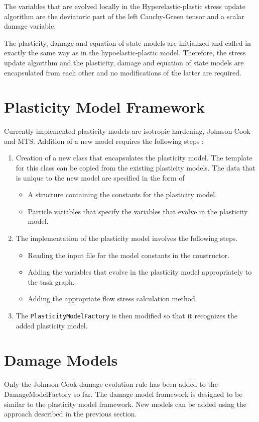The variables that are evolved locally in the Hyperelastic-plastic 
stress update algorithm are the deviatoric part of the left Cauchy-Green
tensor and a scalar damage variable.  

The plasticity, damage and equation of state models are initialized
and called in exactly the same way as in the hypoelastic-plastic 
model.  Therefore, the stress update algorithm and the plasticity,
damage and equation of state models are encapsulated from each other
and no modifications of the latter are required.

\section{Plasticity Model Framework}
Currently implemented plasticity models are isotropic hardening, 
Johnson-Cook and MTS.  Addition of a new model requires the 
following steps :

\begin{enumerate}
    \item Creation of a new class that encapsulates the plasticity 
    model.  The template for this class can be copied from the
    existing plasticity models.  The data that is unique to 
    the new model are specified in the form of 
    \begin{itemize}
      \item A structure containing the constants for the plasticity
            model.
      \item Particle variables that specify the variables that 
            evolve in the plasticity model.
    \end{itemize}
    \item The implementation of the plasticity model involves the
    following steps.
    \begin{itemize}
      \item Reading the input file for the model constants in the
            constructor.
      \item Adding the variables that evolve in the plasticity model
            appropriately to the task graph.
      \item Adding the appropriate flow stress calculation method.
    \end{itemize}
    \item The \verb+PlasticityModelFactory+ is then modified so that
          it recognizes the added plasticity model.
\end{enumerate}

\section{Damage Models}
Only the Johnson-Cook damage evolution rule has been added to the 
DamageModelFactory so far.  The damage model framework is designed 
to be similar to the plasticity model framework.  New models can
be added using the approach described in the previous section.

